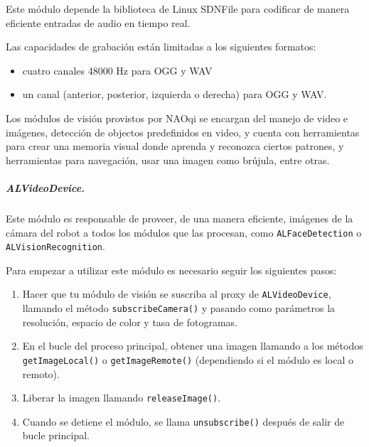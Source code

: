 Este módulo depende la biblioteca de Linux SDNFile para
codificar de manera eficiente entradas de audio en tiempo real.

Las capacidades de grabación están limitadas a los siguientes
formatos:
\begin{itemize}
\item {} 
cuatro canales 48000 Hz para OGG y WAV

\item {} 
un canal (anterior, posterior, izquierda o derecha) para OGG y WAV.

\end{itemize}

Los módulos de visión provistos por NAOqi se encargan del manejo de video e
imágenes, detección de objectos predefinidos en video, y cuenta con herramientas
para crear una memoria visual donde aprenda y reconozca ciertos patrones,
y herramientas para navegación, usar una imagen como brújula, entre otras.


\subparagraph{ALVideoDevice.}
\label{\detokenize{chapter_one/naoqi:alvideodevice}}
Este módulo es responsable de proveer, de una manera eficiente, imágenes de la
cámara del robot a todos los módulos que las procesan, como \texttt{ALFaceDetection}
o \texttt{ALVisionRecognition}.


Para empezar a utilizar este módulo es necesario seguir los siguientes pasos:
\begin{enumerate}
\item {} 
Hacer que tu módulo de visión se suscriba al proxy de \texttt{ALVideoDevice}, llamando el método \texttt{subscribeCamera()} y pasando como parámetros la resolución, espacio de color y tasa de fotogramas.

\item {} 
En el bucle del proceso principal, obtener una imagen llamando a los métodos \texttt{getImageLocal()} o \texttt{getImageRemote()} (dependiendo si el módulo es local o remoto).

\item {} 
Liberar la imagen llamando \texttt{releaseImage()}.

\item {} 
Cuando se detiene el módulo, se llama \texttt{unsubscribe()} después de salir de bucle principal.

\end{enumerate}

